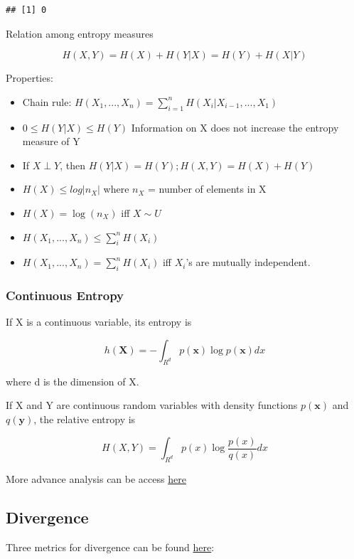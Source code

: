 \documentclass[
]{book}
\providecommand{\tightlist}{%
  \setlength{\itemsep}{0pt}\setlength{\parskip}{0pt}}
\begin{document}
\begin{verbatim}
## [1] 0
\end{verbatim}

Relation among entropy measures

\[
H(X,Y) = H(X) + H(Y|X) = H(Y) + H(X|Y)
\]

Properties:

\begin{itemize}
\tightlist
\item
  Chain rule: \(H(X_1, ..., X_n) = \sum_{i=1}^n H(X_i | X_{i-1},...,X_1)\)
\item
  \(0 \le H(Y|X) \le H(Y)\) Information on X does not increase the entropy measure of Y
\item
  If \(X \perp Y\), then \(H(Y|X) = H(Y); H(X,Y) = H(X) + H(Y)\)
\item
  \(H(X) \le log |n_X|\) where \(n_X\) = number of elements in X
\item
  \(H(X) = \log (n_X)\) iff \(X \sim U\)
\item
  \(H(X_1,...,X_n) \le \sum_i^n H(X_i)\)
\item
  \(H(X_1,...,X_n) = \sum_i^n H(X_i)\) iff \(X_i\)'s are mutually independent.
\end{itemize}

\hypertarget{continuous-entropy}{%
\subsubsection{Continuous Entropy}\label{continuous-entropy}}

If X is a continuous variable, its entropy is

\[
h(\mathbf{X}) = - \int_{R^d} p(\mathbf{x})\log p(\mathbf{x}) dx
\]

where d is the dimension of X.

If X and Y are continuous random variables with density functions \(p(\mathbf{x})\) and \(q(\mathbf{y})\), the relative
entropy is

\[
H(X,Y) = \int_{R^d} p(x) \log \frac{p(x)}{q(x)} dx
\]

More advance analysis can be access \href{https://elife-asu.github.io/rinform/\#4_time_series_measures}{here}

\hypertarget{divergence}{%
\subsection{Divergence}\label{divergence}}

Three metrics for divergence can be found
\href{https://cran.r-project.org/web/packages/philentropy/vignettes/Information_Theory.html}{here}:
\end{document}
